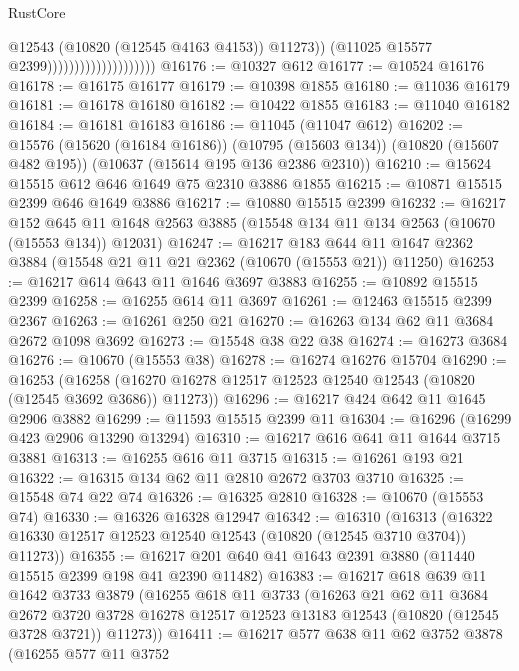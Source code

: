 \begin{lexlean}{RustCore}
\begin{coremodule}
                                              @12543
                                              (@10820 (@12545 @4163 @4153))
                                              @11273))
                                          (@11025 @15577 @2399))))))))))))))))))))
@16176 := @10327 @612
@16177 := @10524 @16176
@16178 := @16175 @16177
@16179 := @10398 @1855
@16180 := @11036 @16179
@16181 := @16178 @16180
@16182 := @10422 @1855
@16183 := @11040 @16182
@16184 := @16181 @16183
@16186 := @11045 (@11047 @612)
@16202 := @15576
    (@15620 (@16184 @16186))
    (@10795 (@15603 @134))
    (@10820 (@15607 @482 @195))
    (@10637 (@15614 @195 @136 @2386 @2310))
@16210 := @15624 @15515 @612 @646 @1649 @75 @2310 @3886 @1855
@16215 := @10871 @15515 @2399 @646 @1649 @3886
@16217 := @10880 @15515 @2399
@16232 := @16217
    @152
    @645
    @11
    @1648
    @2563
    @3885
    (@15548 @134 @11 @134 @2563 (@10670 (@15553 @134)) @12031)
@16247 := @16217
    @183
    @644
    @11
    @1647
    @2362
    @3884
    (@15548 @21 @11 @21 @2362 (@10670 (@15553 @21)) @11250)
@16253 := @16217 @614 @643 @11 @1646 @3697 @3883
@16255 := @10892 @15515 @2399
@16258 := @16255 @614 @11 @3697
@16261 := @12463 @15515 @2399 @2367
@16263 := @16261 @250 @21
@16270 := @16263 @134 @62 @11 @3684 @2672 @1098 @3692
@16273 := @15548 @38 @22 @38
@16274 := @16273 @3684
@16276 := @10670 (@15553 @38)
@16278 := @16274 @16276 @15704
@16290 := @16253
    (@16258 (@16270 @16278 @12517 @12523 @12540 @12543 (@10820 (@12545 @3692 @3686)) @11273))
@16296 := @16217 @424 @642 @11 @1645 @2906 @3882
@16299 := @11593 @15515 @2399 @11
@16304 := @16296 (@16299 @423 @2906 @13290 @13294)
@16310 := @16217 @616 @641 @11 @1644 @3715 @3881
@16313 := @16255 @616 @11 @3715
@16315 := @16261 @193 @21
@16322 := @16315 @134 @62 @11 @2810 @2672 @3703 @3710
@16325 := @15548 @74 @22 @74
@16326 := @16325 @2810
@16328 := @10670 (@15553 @74)
@16330 := @16326 @16328 @12947
@16342 := @16310
    (@16313 (@16322 @16330 @12517 @12523 @12540 @12543 (@10820 (@12545 @3710 @3704)) @11273))
@16355 := @16217 @201 @640 @41 @1643 @2391 @3880 (@11440 @15515 @2399 @198 @41 @2390 @11482)
@16383 := @16217
    @618
    @639
    @11
    @1642
    @3733
    @3879
    (@16255
      @618
      @11
      @3733
      (@16263
        @21
        @62
        @11
        @3684
        @2672
        @3720
        @3728
        @16278
        @12517
        @12523
        @13183
        @12543
        (@10820 (@12545 @3728 @3721))
        @11273))
@16411 := @16217
    @577
    @638
    @11
    @62
    @3752
    @3878
    (@16255
      @577
      @11
      @3752

\end{coremodule}
\end{lexlean}
